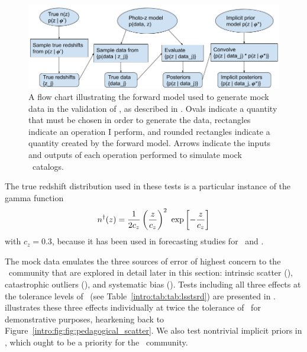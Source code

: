 \begin{figure}
	\begin{center}
		\includegraphics[width=\textwidth]{figures/chippr/flowchart.png}
		\caption{A flow chart illustrating the forward model used to generate mock data in the validation of \Chippr, as described in .
		Ovals indicate a quantity that must be chosen in order to generate the data, rectangles indicate an operation I perform, and rounded rectangles indicate a quantity created by the forward model.
		Arrows indicate the inputs and outputs of each operation performed to simulate mock \pzpdf\ catalogs.}
	\end{center}
\end{figure}

The true redshift distribution used in these tests is a particular instance of the gamma function
\begin{equation}
\eqlabel{eqn:gamma}
n^{\dagger}(z) = \frac{1}{2 c_{z}} \left(\frac{z}{c_{z}}\right)^{2}\ \exp\left[-\frac{z}{c_{z}}\right]
\end{equation}
with $c_{z} = 0.3$, because it has been used in forecasting studies for \des\ and \lsst.

The mock data emulates the three sources of error of highest concern to the \pz\ community that are explored in detail later in this section: intrinsic scatter (), catastrophic outliers (), and systematic bias ().
Tests including all three effects at the tolerance levels of \lsst\ (see Table~\ref{intro:tab:tab:lsstsrd}) are presented in .
 illustrates these three effects individually at twice the tolerance of \lsst\ for demonstrative purposes, hearkening back to Figure~\ref{intro:fig:fig:pedagogical_scatter}.
We also test nontrivial implicit priors in , which ought to be a priority for the \pz\ community.

